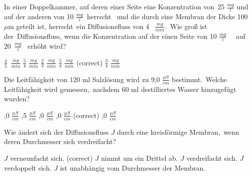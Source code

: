 \documentclass[11pt]{exam}
\begin{document}
\setlength{\voffset}{-0.5in}
\setlength{\headsep}{5pt}

\hspace{2mm}
 \hspace{5mm}
\vspace{4mm}

\begin{questions}

\question In einer Doppelkammer, auf deren einer Seite eine Konzentration von 25 \(\frac{mg}{l} \) und auf der anderen von 10 \(  \frac{mg}{l} \) herrscht  und die durch eine Membran der Dicke 100 \(\mu \)m geteilt ist, herrscht ein Diffusionsfluss von 4  \( \frac{mg}{min}\). Wie groß ist der Diffusionsfluss, wenn die Konzentration auf der einen Seite von 10 \(  \frac{mg}{l} \)   auf 20 \(  \frac{mg}{l} \)  erhöht wird?

\begin{choices}
	\choice \( \frac{4}{5} \) \( \frac{mg}{min} \)
	\choice \( \frac{5}{4} \) \( \frac{mg}{min} \)
	\choice \( \frac{2}{3} \) \( \frac{mg}{min} \)
	\choice \( \frac{5}{4} \) \( \frac{mg}{min} \) (correct)
	\choice \( \frac{3}{4} \) \( \frac{mg}{min} \)
\end{choices}

\vspace{3mm}\question Die Leitfähigkeit von 120 ml Salzlösung wird zu 9,0 \( \frac{\mu S}{cm} \) bestimmt. Welche Leitfähigkeit wird gemessen, nachdem 60 ml destilliertes Wasser hinzugefügt wurden?

\begin{choices}
	,0 \( \frac{\mu S}{cm} \)
	,5 \( \frac{\mu S}{cm} \)
	,0 \( \frac{\mu S}{cm} \)
	,0 \( \frac{\mu S}{cm} \) (correct)
	,0 \( \frac{\mu S}{cm} \)
\end{choices}

\vspace{3mm}\question Wie ändert sich der Diffusionsfluss \( J \) durch eine kreisförmige Membran, wenn deren Durchmesser sich verdreifacht?

\begin{choices}
	\choice \( J \) verneunfacht sich. (correct)
	\choice \( J \) nimmt um ein Drittel ab.
	\choice \( J \) verdreifacht sich.
	\choice \( J \) verdoppelt sich.
	\choice \( J \) ist unabhängig vom Durchmesser der Membran.
\end{choices}


\end{questions}
\end{document}
